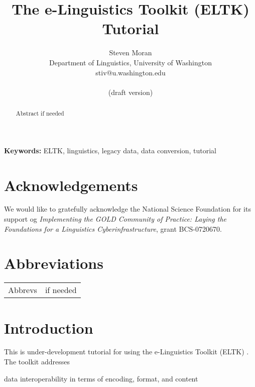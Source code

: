 \documentclass[]{article}
\title{The e-Linguistics Toolkit (ELTK) Tutorial}
\author{Steven Moran\\Department of Linguistics, University of Washington \\stiv@u.washington.edu\\\\(draft version)}
\begin{document}
\maketitle

\textbf{Keywords:} ELTK, linguistics, legacy data, data conversion, tutorial

\newpage

\begin{abstract}
\noindent Abstract if needed
\end{abstract}

\newpage
\section*{Acknowledgements}
We would like to gratefully acknowledge the National Science Foundation for its support og \textit{Implementing the GOLD Community of Practice: Laying the Foundations for a 
Linguistics Cyberinfrastructure}, grant BCS-0720670.

\newpage
{}
\newpage
{}
\tableofcontents
\newpage

\section*{Abbreviations}\label{abbreviations}
\begin{table}[h]
\begin{tabular}[t]{ll}
Abbrevs & if needed \\
\end{tabular}
\end{table}

\newpage

\listoftables
\listoffigures

\newpage

\section{Introduction}\label{sec:introduction}
This is under-development tutorial for using the e-Linguistics Toolkit (ELTK) \cite{FarrarMoran08}. The toolkit addresses 

data interoperability in terms of encoding, format, and content
\end{document}
